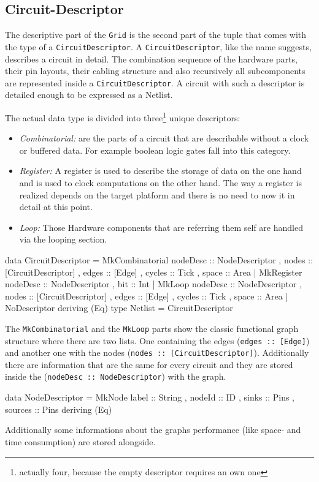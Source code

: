 \documentclass[9pt,final,a4paper,leqno]{article}
\newcommand{\hs}[1]{\mbox{\lstinline[basicstyle=\color{textgray}]!#1!}}
\begin{document}
\subsection{Circuit-Descriptor}
The descriptive part of the \hs{Grid} is the second part of the tuple that comes with the type of a \hs{CircuitDescriptor}. A
\hs{CircuitDescriptor}, like the name suggests, describes a circuit in detail. The combination sequence of the hardware parts, their pin
layouts, their cabling structure and also recursively all subcomponents are represented inside a \hs{CircuitDescriptor}.  A circuit with
such a descriptor is detailed enough to be expressed as a Netlist. 

\par
The actual data type is divided into three\footnote{actually four, because the empty descriptor requires an own one} unique descriptors:
\begin{itemize}
  \item \emph{Combinatorial:} are the parts of a circuit that are describable without a clock or buffered data. For example boolean logic
    gates fall into this category. 
  \item \emph{Register:} A register is used to describe the storage of data on the one hand and is used to clock computations on the other
    hand. The way a register is realized depends on the target platform and there is no need to now it in detail at this point. 
  \item \emph{Loop:} Those Hardware components that are referring them self are handled via the looping section.
\end{itemize}

\begin{haskell}
  data CircuitDescriptor
    = MkCombinatorial
      { nodeDesc :: NodeDescriptor
      , nodes    :: [CircuitDescriptor]
      , edges    :: [Edge]
      , cycles   :: Tick
      , space    :: Area
      }
    | MkRegister
      { nodeDesc :: NodeDescriptor
      , bit      :: Int
      }
    | MkLoop
      { nodeDesc :: NodeDescriptor
      , nodes    :: [CircuitDescriptor]
      , edges    :: [Edge]
      , cycles   :: Tick
      , space    :: Area
      }
    | NoDescriptor
    deriving (Eq)
  type Netlist = CircuitDescriptor
\end{haskell} 

The \hs{MkCombinatorial} and the \hs{MkLoop} parts show the classic functional graph structure where there are two lists. One containing the
edges (\hs{edges :: [Edge]}) and another one with the nodes (\hs{nodes :: [CircuitDescriptor]}).  Additionally there are information that
are the same for every circuit and they are stored inside the (\hs{nodeDesc :: NodeDescriptor}) with the graph. 
\begin{haskell}
  data NodeDescriptor
    = MkNode
      { label   :: String 
      , nodeId  :: ID
      , sinks   :: Pins
      , sources :: Pins
      }
    deriving (Eq)
\end{haskell} 
Additionally some informations about the graphs performance (like space- and time consumption) are stored alongside. 
\end{document}

